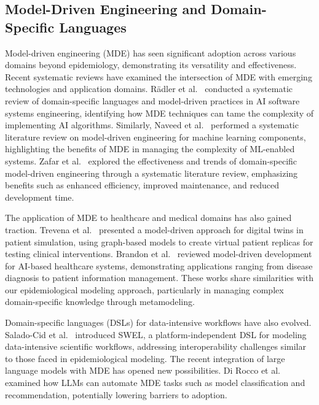 


\subsection{Model-Driven Engineering and Domain-Specific Languages}

Model-driven engineering (MDE) has seen significant adoption across various domains beyond epidemiology, demonstrating its versatility and effectiveness. Recent systematic reviews have examined the intersection of MDE with emerging technologies and application domains. Rädler et al.~\cite{radler2024bridgingmdeai} conducted a systematic review of domain-specific languages and model-driven practices in AI software systems engineering, identifying how MDE techniques can tame the complexity of implementing AI algorithms. Similarly, Naveed et al.~\cite{naveed2024mde4ml} performed a systematic literature review on model-driven engineering for machine learning components, highlighting the benefits of MDE in managing the complexity of ML-enabled systems. Zafar et al.~\cite{zafar2024dsmmde} explored the effectiveness and trends of domain-specific model-driven engineering through a systematic literature review, emphasizing benefits such as enhanced efficiency, improved maintenance, and reduced development time.

The application of MDE to healthcare and medical domains has also gained traction. Trevena et al.~\cite{trevena2024digitaltwins} presented a model-driven approach for digital twins in patient simulation, using graph-based models to create virtual patient replicas for testing clinical interventions. Brandon et al.~\cite{brandon2023mdehealth} reviewed model-driven development for AI-based healthcare systems, demonstrating applications ranging from disease diagnosis to patient information management. These works share similarities with our epidemiological modeling approach, particularly in managing complex domain-specific knowledge through metamodeling.

Domain-specific languages (DSLs) for data-intensive workflows have also evolved. Salado-Cid et al.~\cite{saladocid2023swel} introduced SWEL, a platform-independent DSL for modeling data-intensive scientific workflows, addressing interoperability challenges similar to those faced in epidemiological modeling. The recent integration of large language models with MDE has opened new possibilities. Di Rocco et al.~\cite{dirocco2025llmmde} examined how LLMs can automate MDE tasks such as model classification and recommendation, potentially lowering barriers to adoption.

